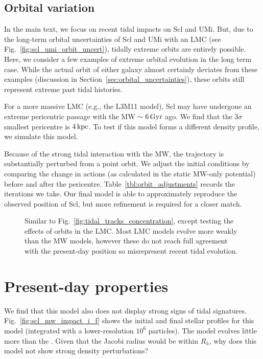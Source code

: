 \subsection{Orbital variation}\label{orbital-variation}

In the main text, we focus on recent tidal impacts on Scl and UMi. But,
due to the long-term orbital uncertainties of Scl and UMi with an LMC
(see Fig.~\ref{fig:scl_umi_orbit_uncert}), tidally extreme orbits are
entirely possible. Here, we consider a few examples of extreme orbital
evolution in the long term case. While the actual orbit of either galaxy
almost certainly deviates from these examples (discussion in
Section~\ref{sec:orbital_uncertainties}), these orbits still represent
extreme past tidal histories.

For a more massive LMC (e.g., the L3M11 model), Scl may have undergone
an extreme pericentric passage with the MW \(\sim 6\,{\rm Gyr}\) ago. We find
that the 3\(\sigma\) smallest pericentre is \(4\,{\rm kpc}\). To test if this
model forms a different density profile, we simulate this model.

Because of the strong tidal interaction with the MW, the trajectory is
substantially perturbed from a point orbit. We adjust the initial
conditions by comparing the change in actions (as calculated in the
static MW-only potential) before and after the pericentre.
Table~\ref{tbl:orbit_adjustments} records the iterations we take. Our
final model is able to approximately reproduce the observed position of
Scl, but more refinement is required for a closer match.

\begin{figure}
\centering
{}
\caption[Ursa Minor tidal dependence on orbit]{Similar to
Fig.~\ref{fig:tidal_tracks_concentration}, except testing the effects of
orbits in the LMC. Most LMC models evolve more weakly than the MW
models, however these do not reach full agreement with the present-day
position so misrepresent recent tidal
evolution.}\label{fig:tidal_tracks_umi}
\end{figure}

\section{Present-day properties}\label{present-day-properties}

We find that this model also does not display strong signs of tidal
signatures. Fig.~\ref{fig:scl_mw_impact_i_f} shows the initial and final
stellar profiles for this model (integrated with a lower-resolution
\(10^6\) particles). The model evolves little more than the
\smallperi{}. Given that the Jacobi radius would be within \(R_h\), why
does this model not show strong density perturbations?

